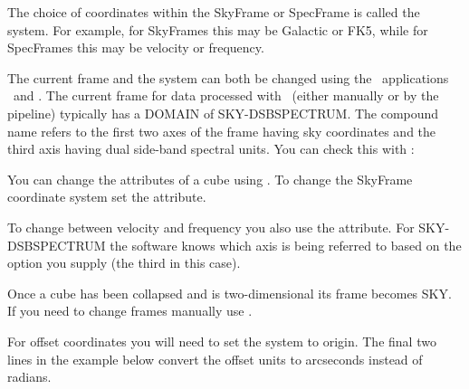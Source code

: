 \documentclass[11pt,oneside,chapters]{starlink}
\begin{document}
The choice of coordinates within the SkyFrame or SpecFrame is called
the system. For example, for SkyFrames this may be Galactic or FK5,
while for SpecFrames this may be velocity or frequency.

The current frame and the system can both be changed using the \Kappa\
applications \wcsframe\ and \wcsattrib. The current frame for data
processed with \makecube\ (either manually or by the pipeline)
typically has a DOMAIN of SKY-DSBSPECTRUM. The compound name refers to
the first two axes of the frame having sky coordinates and the third
axis having dual side-band spectral units. You can check this with
\ndftrace:

\begin{terminalv}
\end{terminalv}
You can change the attributes of a cube using \wcsattrib. To change
the SkyFrame coordinate system set the \param{system} attribute.
\begin{terminalv}
\end{terminalv}
To change between velocity and frequency you also use the
 attribute. For SKY-DSBSPECTRUM the software knows which
axis is being referred to based on the option you supply (the third in
this case).
\begin{terminalv}
\end{terminalv}
Once a cube has been collapsed and is two-dimensional its frame
becomes SKY. If you need to change frames manually use \wcsframe.
\begin{terminalv}
\end{terminalv}

For offset coordinates you will need to set the system
 to origin. The final two lines in the example below
convert the offset units to arcseconds instead of radians.
\begin{terminalv}
\end{terminalv}

%

%
\end{document}
